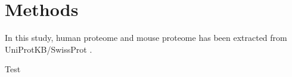\section{Methods}
In this study, human proteome and mouse proteome has been extracted from UniProtKB/SwissProt \cite{2007}. 

Test